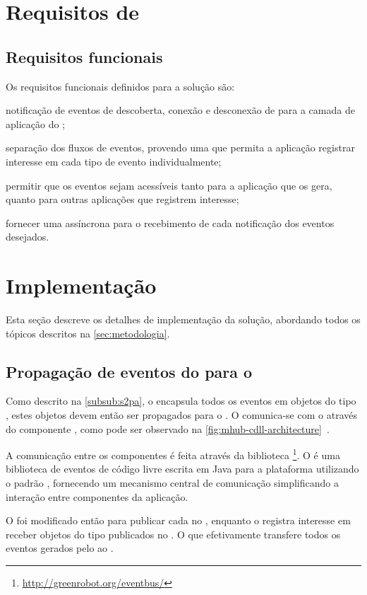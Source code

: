 \section{Requisitos de \software}

\subsection*{Requisitos funcionais}

Os requisitos funcionais definidos para a solução são:

\begin{alineas}
	\item notificação de eventos de descoberta, conexão e desconexão de \smartobjs para a camada de aplicação do \software;

	\item separação dos fluxos de eventos, provendo uma \api que permita a aplicação registrar interesse em cada tipo de evento individualmente;

	\item permitir que os eventos sejam acessíveis tanto para a aplicação que os gera, quanto para outras aplicações que registrem interesse;

	\item fornecer uma \api assíncrona para o recebimento de cada notificação dos eventos desejados.
\end{alineas}

\section{Implementação}

Esta seção descreve os detalhes de implementação da solução, abordando todos os tópicos descritos na \autoref{sec:metodologia}.

\subsection{Propagação de eventos do \stwopa para o \cddl}

Como descrito na \autoref{subsub:s2pa}, o \mhub encapsula todos os eventos em objetos do tipo \sensordata, estes objetos devem então ser propagados para o \cddl.
O \stwopa comunica-se com o \cddl através do componente \qocevaluator, como pode ser observado na \autoref{fig:mhub-cdll-architecture}~\cite{gomes:2017}.

A comunicação entre os componentes é feita através da biblioteca \eventbus\footnote{\url{http://greenrobot.org/eventbus/}}.
O \eventbus é uma biblioteca de eventos de código livre escrita em Java para a plataforma \android utilizando o padrão \pubsub, fornecendo um mecanismo central de comunicação simplificando a interação entre componentes da aplicação.

O \stwopa foi modificado então para publicar cada \sensordata no \eventbus, enquanto o \qocevaluator registra interesse em receber objetos do tipo \sensordata publicados no \eventbus.
O que efetivamente transfere todos os eventos gerados pelo \stwopa ao \cddl.

